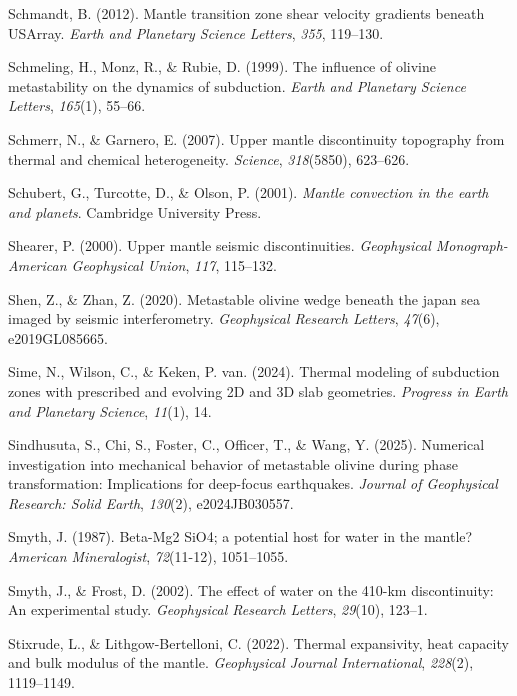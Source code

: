 \documentclass[
  paper=a4,
  ,captions=tableheading
]{scrartcl}
\newlength{\cslhangindent}
\newenvironment{CSLReferences}[2] %
  {\begin{list}{}{%
   \setlength{\itemindent}{0pt}
   \setlength{\leftmargin}{0pt}
   \setlength{\parsep}{0pt}
   \ifodd #1
    \setlength{\leftmargin}{\cslhangindent}
    \setlength{\itemindent}{-1\cslhangindent}
   \fi
   \setlength{\itemsep}{#2\baselineskip}}}
  {\end{list}}
\begin{document}
\begin{CSLReferences}{1}{0}
Schmandt, B. (2012). Mantle transition zone shear velocity gradients
beneath USArray. \emph{Earth and Planetary Science Letters}, \emph{355},
119--130.

Schmeling, H., Monz, R., \& Rubie, D. (1999). The influence of olivine
metastability on the dynamics of subduction. \emph{Earth and Planetary
Science Letters}, \emph{165}(1), 55--66.

Schmerr, N., \& Garnero, E. (2007). Upper mantle discontinuity
topography from thermal and chemical heterogeneity. \emph{Science},
\emph{318}(5850), 623--626.

Schubert, G., Turcotte, D., \& Olson, P. (2001). \emph{Mantle convection
in the earth and planets}. Cambridge University Press.

Shearer, P. (2000). Upper mantle seismic discontinuities.
\emph{Geophysical Monograph-American Geophysical Union}, \emph{117},
115--132.

Shen, Z., \& Zhan, Z. (2020). Metastable olivine wedge beneath the japan
sea imaged by seismic interferometry. \emph{Geophysical Research
Letters}, \emph{47}(6), e2019GL085665.

Sime, N., Wilson, C., \& Keken, P. van. (2024). Thermal modeling of
subduction zones with prescribed and evolving 2D and 3D slab geometries.
\emph{Progress in Earth and Planetary Science}, \emph{11}(1), 14.

Sindhusuta, S., Chi, S., Foster, C., Officer, T., \& Wang, Y. (2025).
Numerical investigation into mechanical behavior of metastable olivine
during phase transformation: Implications for deep-focus earthquakes.
\emph{Journal of Geophysical Research: Solid Earth}, \emph{130}(2),
e2024JB030557.

Smyth, J. (1987). Beta-Mg2 SiO4; a potential host for water in the
mantle? \emph{American Mineralogist}, \emph{72}(11-12), 1051--1055.

Smyth, J., \& Frost, D. (2002). The effect of water on the 410-km
discontinuity: An experimental study. \emph{Geophysical Research
Letters}, \emph{29}(10), 123--1.

Stixrude, L., \& Lithgow-Bertelloni, C. (2022). Thermal expansivity,
heat capacity and bulk modulus of the mantle. \emph{Geophysical Journal
International}, \emph{228}(2), 1119--1149.


\end{CSLReferences}
\end{document}
